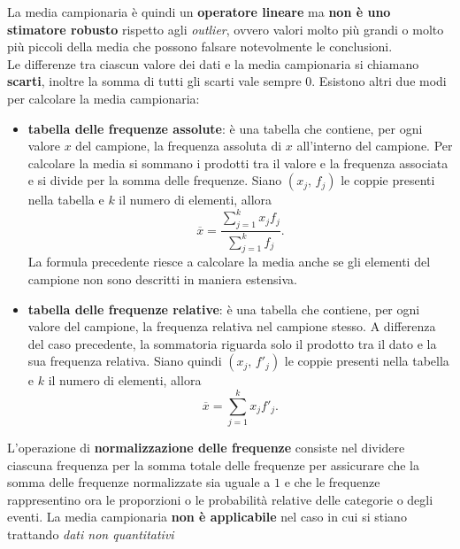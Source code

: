 La media campionaria è quindi un \textbf{operatore lineare} ma \textbf{non è uno stimatore robusto} rispetto agli \textit{outlier}, ovvero valori molto più grandi o molto più piccoli della media che possono falsare notevolmente le conclusioni. \\
Le differenze tra ciascun valore dei dati e la media campionaria si chiamano \textbf{scarti}, inoltre la somma di tutti gli scarti vale sempre $0$.
\newline \newline
Esistono altri due modi per calcolare la media campionaria:
\begin{itemize}
    \item \textbf{tabella delle frequenze assolute}: è una tabella che contiene, per ogni valore $x$ del campione, la frequenza assoluta di $x$ all'interno del campione. 
    Per calcolare la media si sommano i prodotti tra il valore e la frequenza associata e si divide per la somma delle frequenze.
    Siano $(x_j, \, f_j)$ le coppie presenti nella tabella e $k$ il numero di elementi, allora
    \setlength\abovedisplayskip{2pt} \[
    \overline{x} =
    \dfrac{
        \sum\limits_{j=1}^{k}{x_j f_j}
    }{
        \sum\limits_{j=1}^{k}{f_j}
    }.
    \]
    La formula precedente riesce a calcolare la media anche se gli elementi del campione non sono descritti in maniera estensiva.
    
    \item \textbf{tabella delle frequenze relative}: è una tabella che contiene, per ogni valore del campione, la frequenza relativa nel campione stesso. A differenza del caso precedente, la sommatoria riguarda solo il prodotto tra il dato e la sua frequenza relativa. Siano quindi $(x_j, \, f'_j)$ le coppie presenti nella tabella e $k$ il numero di elementi, allora
    \[
    \overline{x} = \sum\limits_{j=1}^{k}{x_j f'_j}.
    \]
\end{itemize}

\noindent L'operazione di \textbf{normalizzazione delle frequenze} consiste nel dividere ciascuna frequenza per la somma totale delle frequenze per assicurare che la somma delle frequenze normalizzate sia uguale a $1$ e che le frequenze rappresentino ora le proporzioni o le probabilità relative delle categorie o degli eventi.
\noindent La media campionaria \textbf{non è applicabile} nel caso in cui si stiano trattando \textit{dati non quantitativi}

